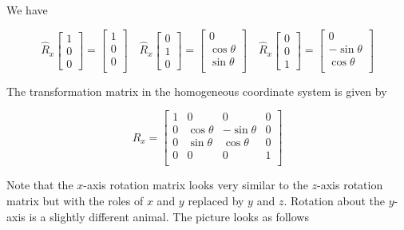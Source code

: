 \documentclass[12pt]{article}
\newcommand{\nin}{\noindent}
\newcommand{\vthree}{\vspace{3mm}}
\newcommand{\mymat}[1]{
\left[
\begin{array}{rrrrrrrrrrrrrrrrrrrrrrrrrrrrrrrrrrrrrrr}
#1
\end{array}
\right]
}
\begin{document}
\vthree

\nin We have

\[
\hat{R}_x\mymat{
1 \\
0 \\
0
}
=
\mymat{
1 \\
0 \\
0 \\
}
\quad
\hat{R}_x\mymat{
0 \\
1 \\
0
}
=
\mymat{
0 \\
\cos\theta \\
\sin\theta \\
}
\quad
\hat{R}_x\mymat{
0 \\
0 \\
1
}
=
\mymat{
0 \\
-\sin\theta \\
\cos\theta \\
}
\]

\vthree

\nin The transformation matrix in the homogeneous coordinate system is given by

\[
R_x =
\mymat{
1 & 0 & 0 & 0 \\
0 & \cos\theta & -\sin\theta  & 0 \\
0 & \sin\theta &  \cos\theta  & 0 \\
0 & 0 & 0 & 1 \\
}
\]

\vthree

\nin Note that the $x$-axis rotation matrix looks very similar to the $z$-axis rotation matrix but with the roles of $x$ and $y$ replaced by $y$ and $z$.  Rotation about the $y$-axis is a slightly different animal.  The picture looks as follows

\vspace{10mm}
\end{document}
